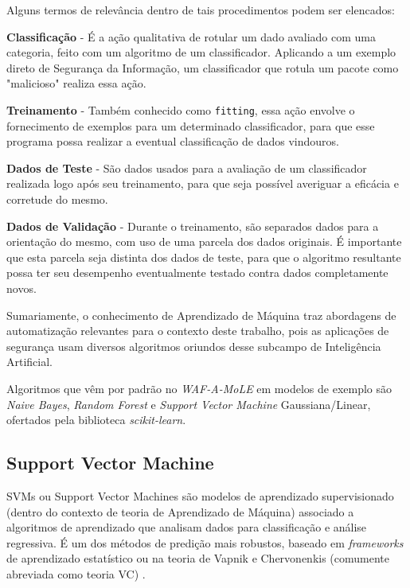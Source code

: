 Alguns termos de relevância dentro de tais procedimentos podem ser elencados:
\begin{alineas}
\item \textbf{Classificação} - É a ação qualitativa de rotular um dado avaliado com uma categoria, feito com um algoritmo de um classificador. Aplicando a um exemplo direto de Segurança da Informação, um classificador que rotula um pacote como "malicioso" realiza essa ação.
\item \textbf{Treinamento} - Também conhecido como \verb+fitting+, essa ação envolve o fornecimento de exemplos para um determinado classificador, para que esse programa possa realizar a eventual classificação de dados vindouros.
\item \textbf{Dados de Teste} - São dados usados para a avaliação de um classificador realizada logo após seu treinamento, para que seja possível averiguar a eficácia e corretude do mesmo.
\item \textbf{Dados de Validação} - Durante o treinamento, são separados dados para a orientação do mesmo, com uso de uma parcela dos dados originais. É importante que esta parcela seja distinta dos dados de teste, para que o algoritmo resultante possa ter seu desempenho eventualmente testado contra dados completamente novos.

\end{alineas}


Sumariamente, o conhecimento de Aprendizado de Máquina traz abordagens
de automatização relevantes para o contexto deste trabalho, pois as aplicações de segurança usam diversos algoritmos oriundos desse subcampo de
Inteligência Artificial.

Algoritmos que vêm por padrão no \textit{WAF-A-MoLE} em modelos de exemplo são \textit{Naive Bayes}, \textit{Random Forest} e \textit{Support Vector Machine} Gaussiana/Linear, ofertados pela biblioteca \textit{scikit-learn}.

\subsection{Support Vector Machine}
SVMs ou Support Vector Machines são modelos de aprendizado supervisionado (dentro do contexto de teoria de Aprendizado de Máquina) associado a algoritmos de aprendizado que analisam dados para classificação e análise regressiva. É um dos métodos de predição mais robustos, baseado em \textit{frameworks} de aprendizado estatístico ou na teoria de Vapnik e Chervonenkis (comumente abreviada como teoria VC) \cite{ben2001_vapnik_support}.

